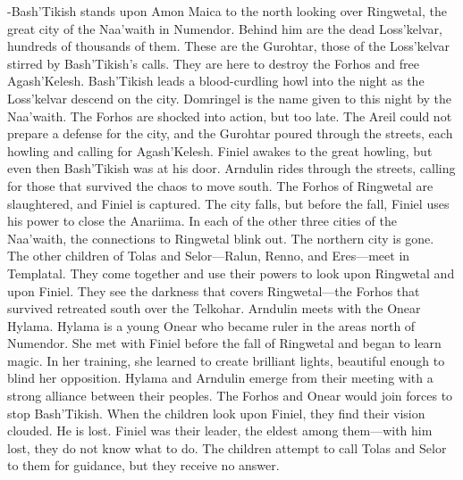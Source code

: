 \documentclass[smalldemyvopaper,11pt,twoside,onecolumn,openright,extrafontsizes]{memoir}
\begin{document}
-Bash’Tikish stands upon Amon Maica to the north looking over Ringwetal, the great city of the Naa’waith in Numendor. Behind him are the dead Loss’kelvar, hundreds of thousands of them. These are the Gurohtar, those of the Loss’kelvar stirred by Bash’Tikish’s calls. They are here to destroy the Forhos and free Agash’Kelesh. Bash’Tikish leads a blood-curdling howl into the night as the Loss’kelvar descend on the city. Domringel is the name given to this night by the Naa’waith. The Forhos are shocked into action, but too late. The Areil could not prepare a defense for the city, and the Gurohtar poured through the streets, each howling and calling for Agash’Kelesh. Finiel awakes to the great howling, but even then Bash’Tikish was at his door. Arndulin rides through the streets, calling for those that survived the chaos to move south. The Forhos of Ringwetal are slaughtered, and Finiel is captured. The city falls, but before the fall, Finiel uses his power to close the Anariima. In each of the other three cities of the Naa’waith, the connections to Ringwetal blink out. The northern city is gone. The other children of Tolas and Selor—Ralun, Renno, and Eres—meet in Templatal. They come together and use their powers to look upon Ringwetal and upon Finiel. They see the darkness that covers Ringwetal—the Forhos that survived retreated south over the Telkohar. Arndulin meets with the Onear Hylama. Hylama is a young Onear who became ruler in the areas north of Numendor. She met with Finiel before the fall of Ringwetal and began to learn magic. In her training, she learned to create brilliant lights, beautiful enough to blind her opposition. Hylama and Arndulin emerge from their meeting with a strong alliance between their peoples. The Forhos and Onear would join forces to stop Bash’Tikish. When the children look upon Finiel, they find their vision clouded. He is lost. Finiel was their leader, the eldest among them—with him lost, they do not know what to do. The children attempt to call Tolas and Selor to them for guidance, but they receive no answer.
\end{document}
